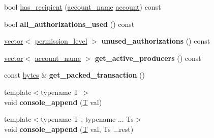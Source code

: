 \begin{DoxyCompactItemize}
\item 
bool \mbox{\hyperlink{classaacio_1_1chain_1_1apply__context_ac787146418685b7dda0b701e6cb7515b}{has\+\_\+recipient}} (\mbox{\hyperlink{structaacio_1_1chain_1_1name}{account\+\_\+name}} \mbox{\hyperlink{structaccount}{account}}) const
\item 
\mbox{\label{classaacio_1_1chain_1_1apply__context_a7aba5cb7910090caf21d3211a23d885b}} 
bool {\bfseries all\+\_\+authorizations\+\_\+used} () const
\item 
\mbox{\label{classaacio_1_1chain_1_1apply__context_a13f0846a67ff8b526a4b598a454cc84d}} 
\mbox{\hyperlink{classstd_1_1vector}{vector}}$<$ \mbox{\hyperlink{structaacio_1_1chain_1_1permission__level}{permission\+\_\+level}} $>$ {\bfseries unused\+\_\+authorizations} () const
\item 
\mbox{\label{classaacio_1_1chain_1_1apply__context_abd3e565320040841131feda5e46494e4}} 
\mbox{\hyperlink{classstd_1_1vector}{vector}}$<$ \mbox{\hyperlink{structaacio_1_1chain_1_1name}{account\+\_\+name}} $>$ {\bfseries get\+\_\+active\+\_\+producers} () const
\item 
\mbox{\label{classaacio_1_1chain_1_1apply__context_abd970772cfee8332a1a4b5c7b48ffb23}} 
const \mbox{\hyperlink{classstd_1_1vector}{bytes}} \& {\bfseries get\+\_\+packed\+\_\+transaction} ()
\item 
\mbox{\label{classaacio_1_1chain_1_1apply__context_a10aed3745dc63bdda72ebe6c7e3c54db}} 
{\footnotesize template$<$typename T $>$ }\\void {\bfseries console\+\_\+append} (\mbox{\hyperlink{struct_t}{T}} val)
\item 
\mbox{\label{classaacio_1_1chain_1_1apply__context_a270a9badfad70a1b95d2dcbeccc2b997}} 
{\footnotesize template$<$typename T , typename ... Ts$>$ }\\void {\bfseries console\+\_\+append} (\mbox{\hyperlink{struct_t}{T}} val, Ts ...rest)
\item 
\mbox{\label{classaacio_1_1chain_1_1apply__context_a85410ed3fa1c1233386938d702c86cfc}} 

\end{DoxyCompactItemize}

